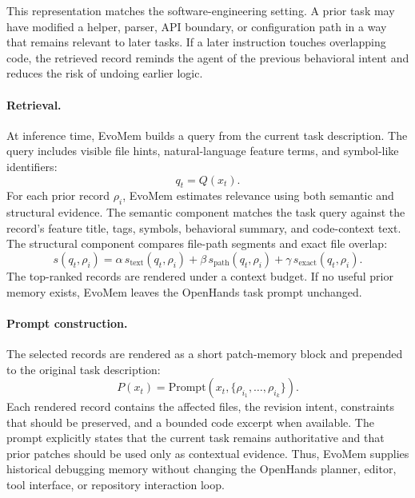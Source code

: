\documentclass{article}
\begin{document}
This representation matches the software-engineering setting. A prior task may have modified a helper, parser, API boundary, or configuration path in a way that remains relevant to later tasks. If a later instruction touches overlapping code, the retrieved record reminds the agent of the previous behavioral intent and reduces the risk of undoing earlier logic.

\paragraph{Retrieval.}
At inference time, EvoMem builds a query from the current task description. The query includes visible file hints, natural-language feature terms, and symbol-like identifiers:
\[
q_t=Q(x_t).
\]
For each prior record $\rho_i$, EvoMem estimates relevance using both semantic and structural evidence. The semantic component matches the task query against the record's feature title, tags, symbols, behavioral summary, and code-context text. The structural component compares file-path segments and exact file overlap:
\[
s(q_t,\rho_i)
=
\alpha\,s_{\mathrm{text}}(q_t,\rho_i)
+
\beta\,s_{\mathrm{path}}(q_t,\rho_i)
+
\gamma\,s_{\mathrm{exact}}(q_t,\rho_i).
\]
The top-ranked records are rendered under a context budget. If no useful prior memory exists, EvoMem leaves the OpenHands task prompt unchanged.

\paragraph{Prompt construction.}
The selected records are rendered as a short patch-memory block and prepended to the original task description:
\[
P(x_t)=\mathrm{Prompt}\!\left(x_t,\{\rho_{i_1},\ldots,\rho_{i_k}\}\right).
\]
Each rendered record contains the affected files, the revision intent, constraints that should be preserved, and a bounded code excerpt when available. The prompt explicitly states that the current task remains authoritative and that prior patches should be used only as contextual evidence. Thus, EvoMem supplies historical debugging memory without changing the OpenHands planner, editor, tool interface, or repository interaction loop.
\end{document}
